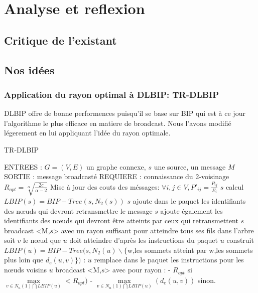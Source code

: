 
\chapter{Analyse et reflexion}\label{Analyse_et_reflexion}


\section{Critique de l'existant}



 


\section{Nos idées}

\subsection{Application du rayon optimal à DLBIP: TR-DLBIP}

DLBIP offre de bonne performences puisqu'il se base sur BIP qui est à ce jour l'algorithme le plus efficace en matiere de broadcast.
Nous l'avons modifié légerement en lui appliquant l'idée du rayon optimale.

\begin{algorithm}[H]
\caption{TR-DLBIP}
\label{algo_TRDLBIP}
\begin{algorithmic}
\STATE ENTREES : $G=(V,E)$ un graphe connexe, $s$ une source, un message $M$
\STATE SORTIE : message broadcasté
\STATE REQUIERE : connaissance du 2-voisinage
\STATE $R_{opt}=\sqrt[\alpha]{\frac{2c}{\alpha-2}}$
\STATE Mise à jour des couts des méssages: $ \forall i,j \in V, P'_{ij}=\frac{P_{ij}}{E_i}$
\STATE $s$ calcul $LBIP(s)=BIP-Tree(s,N_2(s))$
\STATE $s$ ajoute dans le paquet les identifiants des nœuds qui devront retransmettre le message
\STATE $s$ ajoute également les identifiants des nœuds qui devront être atteints par ceux qui retransmettent
\STATE $s$ broadcast <M,$s$> avec un rayon suffisant pour atteindre tous ses fils dans l'arbre
		\STATE soit $v$ le nœud que $u$ doit atteindre d'après les instructions du paquet
		\STATE $u$ construit $LBIP(u)=BIP-Tree(s,N_2(u)\backslash \{$w,les sommets atteint par w,les sommets plus loin que $d_e(u,v)\})$ :
			\INDSTATE $u$ remplace dans le paquet les instructions pour les nœuds voisins
			\INDSTATE $u$ broadcast <M,$s$> avec pour rayon : 
			      \INDSTATE[2] - $R_{opt}$ si $\max\limits_{v\in N_u(1)\bigcap LBIP(u)}< R_{opt})$
			      \INDSTATE[2] - $\max\limits_{v\in N_u(1)\bigcap LBIP(u)}(d_e(u,v))$ sinon.
	\ENDIF
\ENDIF
\end{algorithmic}
\end{algorithm}


\subsection{}








